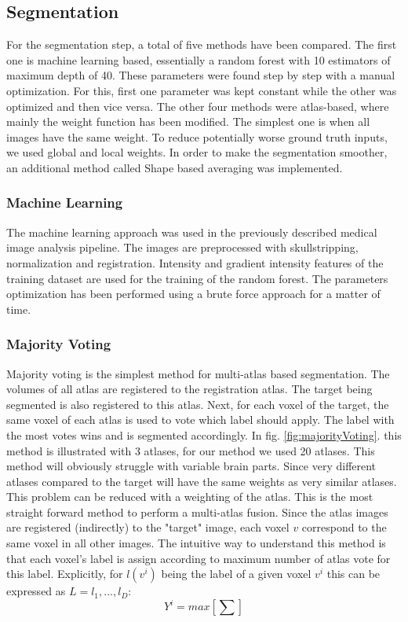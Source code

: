 \subsection*{Segmentation}
For the segmentation step, a total of five methods have been compared. The first one is machine learning based, essentially a random forest with 10 estimators of maximum depth of 40. These parameters were found step by step with a manual optimization. For this, first one parameter was kept constant while the other was optimized and then vice versa. The other four methods were atlas-based, where mainly the weight function has been modified. The simplest one is when all images have the same weight. To reduce potentially worse ground truth inputs, we used global and local weights. In order to make the segmentation smoother, an additional method called Shape based averaging was implemented.

\subsubsection*{Machine Learning}
The machine learning approach was used in the previously described medical image analysis pipeline. The images are preprocessed with skullstripping, normalization and registration. Intensity and gradient intensity features of the training dataset are used for the training of the random forest. The  parameters optimization has been performed using a brute force approach for a matter of time.

\subsubsection*{Majority Voting}
Majority voting is the simplest method for multi-atlas based segmentation. The volumes of all atlas are registered to the registration atlas. The target being segmented is also registered to this atlas. Next, for each voxel of the target, the same voxel of each atlas is used to vote which label should apply. The label with the most votes wins and is segmented accordingly. In fig. \ref{fig:majorityVoting}. this method is illustrated with 3 atlases, for our method we used 20 atlases. This method will obviously struggle with variable brain parts. Since very different atlases compared to the target will have the same weights as very similar atlases. This problem can be reduced with a weighting of the atlas.
This is the most straight forward method to perform a multi-atlas fusion. Since the atlas images are registered (indirectly) to the "target" image, each voxel $v$ correspond to the same voxel in all other images. The intuitive way to understand this method is that each voxel's label is assign according to maximum number of atlas vote for this label. Explicitly, for $l(v^{i})$ being the label of a given voxel $v^{i}$ this can be expressed as $L={l_1, ... , l_D}$:
\[ Y^{i}=max[\sum{}] \]



